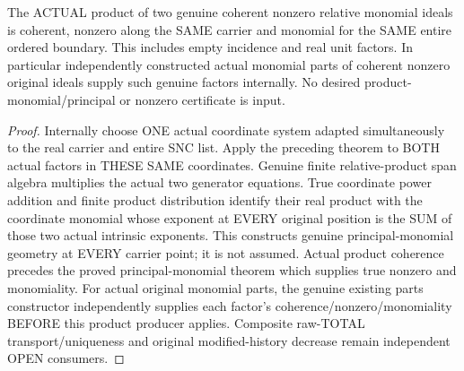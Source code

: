 \begin{theorem}
\label{hir:sharp-actual-relative-monomial-product-closure}
\leanok
The ACTUAL product of two genuine coherent nonzero relative monomial
ideals is coherent, nonzero along the SAME carrier and monomial for the
SAME entire ordered boundary. This includes empty incidence and real unit
factors. In particular independently constructed actual monomial parts
of coherent nonzero original ideals supply such genuine factors internally.
No desired product-monomial/principal or nonzero certificate is input.
\end{theorem}
\begin{proof}
Internally choose ONE actual coordinate system adapted simultaneously to
the real carrier and entire SNC list. Apply the preceding theorem to BOTH
actual factors in THESE SAME coordinates. Genuine finite relative-product
span algebra multiplies the actual two generator equations. True coordinate
power addition and finite product distribution identify their real product
with the coordinate monomial whose exponent at EVERY original position is
the SUM of those two actual intrinsic exponents. This constructs genuine
principal-monomial geometry at EVERY carrier point; it is not assumed.
Actual product coherence precedes the proved principal-monomial theorem
which supplies true nonzero and monomiality. For actual original monomial
parts, the genuine existing parts constructor independently supplies each
factor's coherence/nonzero/monomiality BEFORE this product producer applies.
Composite raw-TOTAL transport/uniqueness and original modified-history
decrease remain independent OPEN consumers.
\end{proof}
